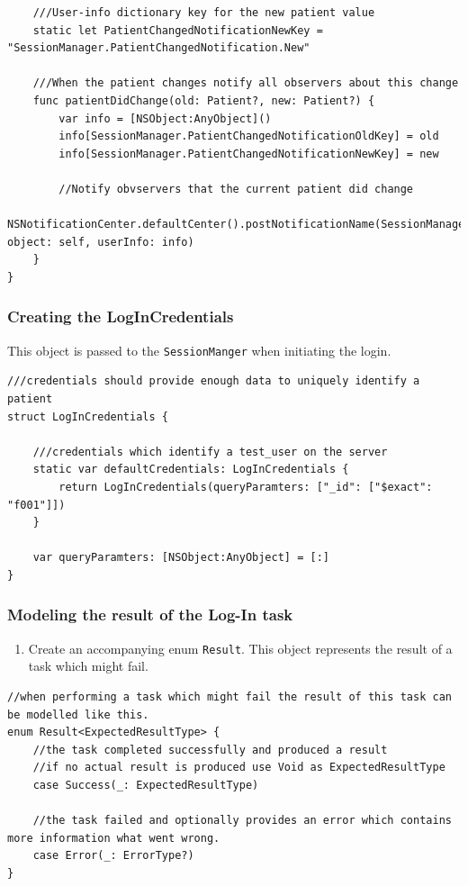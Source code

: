 \documentclass{article}
\begin{document}
\begin{enumerate}
\begin{verbatim}
    ///User-info dictionary key for the new patient value
    static let PatientChangedNotificationNewKey = "SessionManager.PatientChangedNotification.New"

    ///When the patient changes notify all observers about this change
    func patientDidChange(old: Patient?, new: Patient?) {
        var info = [NSObject:AnyObject]()
        info[SessionManager.PatientChangedNotificationOldKey] = old
        info[SessionManager.PatientChangedNotificationNewKey] = new

        //Notify obvservers that the current patient did change
        NSNotificationCenter.defaultCenter().postNotificationName(SessionManager.PatientChangedNotification, object: self, userInfo: info)
    }
}

\end{verbatim}

\end{enumerate}

\subsubsection{Creating the LogInCredentials}

This object is passed to the \texttt{SessionManger} when initiating the login.

\begin{verbatim}
///credentials should provide enough data to uniquely identify a patient
struct LogInCredentials {

    ///credentials which identify a test_user on the server
    static var defaultCredentials: LogInCredentials {
        return LogInCredentials(queryParamters: ["_id": ["$exact": "f001"]])
    }

    var queryParamters: [NSObject:AnyObject] = [:]
}
\end{verbatim}

\subsubsection{Modeling the result of the Log-In task}
\begin{enumerate}
\item
  Create an accompanying enum \texttt{Result}. This object represents
  the result of a task which might fail.
\end{enumerate}

\begin{verbatim}
//when performing a task which might fail the result of this task can be modelled like this.
enum Result<ExpectedResultType> {
    //the task completed successfully and produced a result
    //if no actual result is produced use Void as ExpectedResultType
    case Success(_: ExpectedResultType)

    //the task failed and optionally provides an error which contains more information what went wrong.
    case Error(_: ErrorType?)
}
\end{verbatim}
\end{document}
